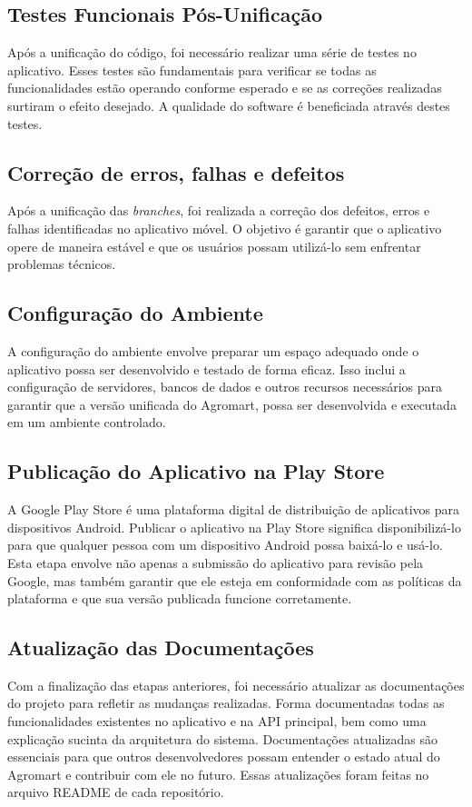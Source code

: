 \subsection{Testes Funcionais Pós-Unificação}
Após a unificação do código, foi necessário realizar uma série de testes no aplicativo. Esses testes são fundamentais para verificar se todas as funcionalidades estão operando conforme esperado e se as correções realizadas surtiram o efeito desejado. A qualidade do software é beneficiada através destes testes.

\subsection{Correção de erros, falhas e defeitos}
Após a unificação das \textit{branches}, foi realizada a correção dos defeitos, erros e falhas identificadas no aplicativo móvel. O objetivo é garantir que o aplicativo opere de maneira estável e que os usuários possam utilizá-lo sem enfrentar problemas técnicos.

\subsection{Configuração do Ambiente}
A configuração do ambiente envolve preparar um espaço adequado onde o aplicativo possa ser desenvolvido e testado de forma eficaz. Isso inclui a configuração de servidores, bancos de dados e outros recursos necessários para garantir que a versão unificada do Agromart, possa ser desenvolvida e executada em um ambiente controlado.

\subsection{Publicação do Aplicativo na Play Store}
A Google Play Store é uma plataforma digital de distribuição de aplicativos para dispositivos Android. Publicar o aplicativo na Play Store significa disponibilizá-lo para que qualquer pessoa com um dispositivo Android possa baixá-lo e usá-lo. Esta etapa envolve não apenas a submissão do aplicativo para revisão pela Google, mas também garantir que ele esteja em conformidade com as políticas da plataforma e que sua versão publicada funcione corretamente.

\subsection{Atualização das Documentações}
Com a finalização das etapas anteriores, foi necessário atualizar as documentações do projeto para refletir as mudanças realizadas. Forma documentadas todas as funcionalidades existentes no aplicativo e na API principal, bem como uma explicação sucinta da arquitetura do sistema. Documentações atualizadas são essenciais para que outros desenvolvedores possam entender o estado atual do Agromart e contribuir com ele no futuro. Essas atualizações foram feitas no arquivo README de cada repositório.
